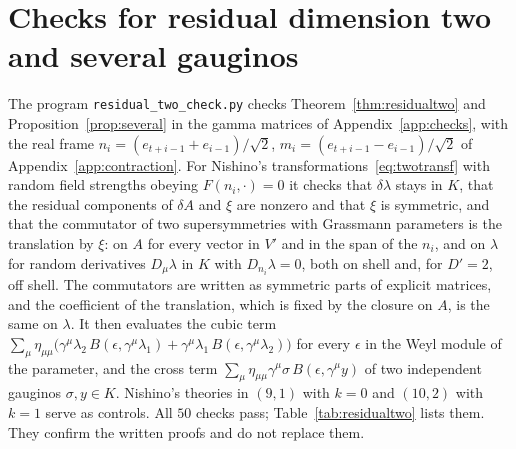 \section{Checks for residual dimension two and several gauginos}
\label{app:residualtwo}

The program \texttt{residual\_two\_check.py} checks Theorem~\ref{thm:residualtwo} and Proposition~\ref{prop:several} in the gamma matrices of Appendix~\ref{app:checks}, with the real frame $n_i=(e_{t+i-1}+e_{i-1})/\sqrt2$, $m_i=(e_{t+i-1}-e_{i-1})/\sqrt2$ of Appendix~\ref{app:contraction}. For Nishino's transformations~\eqref{eq:twotransf} with random field strengths obeying $F(n_i,\cdot)=0$ it checks that $\delta\lambda$ stays in $K$, that the residual components of $\delta A$ and $\xi$ are nonzero and that $\xi$ is symmetric, and that the commutator of two supersymmetries with Grassmann parameters is the translation by $\xi$: on $A$ for every vector in $V'$ and in the span of the $n_i$, and on $\lambda$ for random derivatives $D_\mu\lambda$ in $K$ with $D_{n_i}\lambda=0$, both on shell and, for $D'=2$, off shell. The commutators are written as symmetric parts of explicit matrices, and the coefficient of the translation, which is fixed by the closure on $A$, is the same on $\lambda$. It then evaluates the cubic term $\sum_\mu\eta_{\mu\mu}\bigl(\gamma^\mu\lambda_2\,B(\epsilon,\gamma^\mu\lambda_1)+\gamma^\mu\lambda_1\,B(\epsilon,\gamma^\mu\lambda_2)\bigr)$ for every $\epsilon$ in the Weyl module of the parameter, and the cross term $\sum_\mu\eta_{\mu\mu}\gamma^\mu\sigma\,B(\epsilon,\gamma^\mu y)$ of two independent gauginos $\sigma,y\in K$. Nishino's theories in $(9,1)$ with $k=0$ and $(10,2)$ with $k=1$ serve as controls. All $50$ checks pass; Table~\ref{tab:residualtwo} lists them. They confirm the written proofs and do not replace them.

